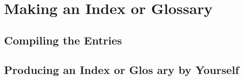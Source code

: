 \section{Making an Index or Glossary}
\subsection{Compiling the Entries}


\subsection{Producing an Index or Glos ary by Yourself}